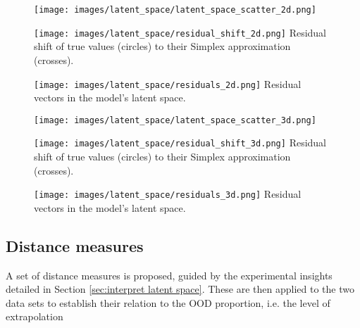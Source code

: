 \documentclass{article}
\begin{document}
\begin{figure}[h]
\centering
\begin{minipage}{.25\textwidth}
  \centering
  \texttt{[image: images/latent\_space/latent\_space\_scatter\_2d.png]}
  \label{latents_2d}
\end{minipage}%
\hspace{.05\textwidth}
\begin{minipage}{.25\textwidth}
  \centering
  \texttt{[image: images/latent\_space/residual\_shift\_2d.png]}
  {Residual shift of true values (circles) to their Simplex approximation (crosses).}
  \label{residual_shift_2d}
\end{minipage}
\begin{minipage}{.25\textwidth}
  \centering
  \texttt{[image: images/latent\_space/residuals\_2d.png]}
  {Residual vectors in the model's latent space.}
  \label{residuals_2d}
\end{minipage}
\end{figure}


\begin{figure}[h]
\centering
\begin{minipage}{.25\textwidth}
  \centering
  \texttt{[image: images/latent\_space/latent\_space\_scatter\_3d.png]}
  \label{latents_3d}
\end{minipage}%
\hspace{.05\textwidth}
\begin{minipage}{.25\textwidth}
  \centering
  \texttt{[image: images/latent\_space/residual\_shift\_3d.png]}
  {Residual shift of true values (circles) to their Simplex approximation (crosses).}
  \label{residual_shift_3d}
\end{minipage}
\begin{minipage}{.25\textwidth}
  \centering
  \texttt{[image: images/latent\_space/residuals\_3d.png]}
  {Residual vectors in the model's latent space.}
  \label{residuals_3d}
\end{minipage}
\end{figure}


\subsection{Distance measures}
\label{sec:distance measures}
A set of distance measures is proposed, guided by the experimental insights detailed in Section \ref{sec:interpret latent space}. These are then applied to the two data sets to establish their relation to the OOD proportion, i.e. the level of extrapolation
\end{document}
